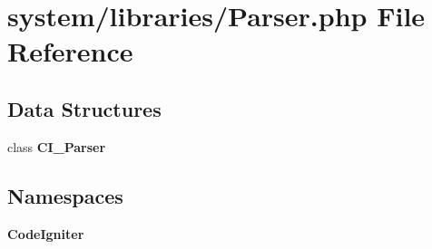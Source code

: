 \section{system/libraries/\-Parser.php File Reference}
\label{_parser_8php}
\subsection*{Data Structures}
\begin{DoxyCompactItemize}
\item 
class {\bf C\-I\-\_\-\-Parser}
\end{DoxyCompactItemize}
\subsection*{Namespaces}
\begin{DoxyCompactItemize}
\item 
{\bf Code\-Igniter}
\end{DoxyCompactItemize}
